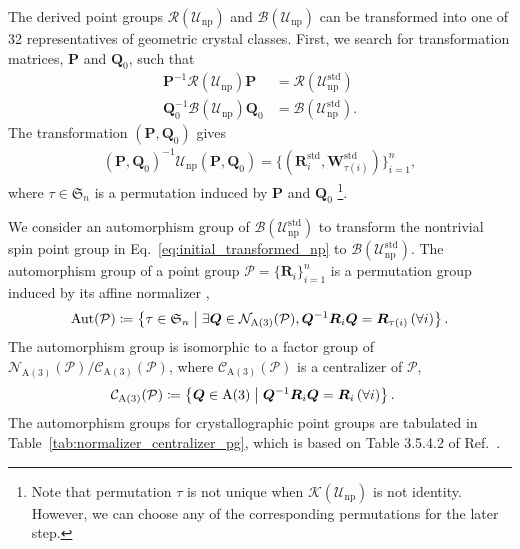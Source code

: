 The derived point groups $\mathcal{R}(\mathcal{U}_{\mathrm{np}})$ and $\mathcal{B}(\mathcal{U}_{\mathrm{np}})$ can be transformed into one of 32 representatives of geometric crystal classes.
First, we search for transformation matrices, $\bm{P}$ and $\bm{Q}_{0}$, such that
\begin{align}
  \bm{P}^{-1} \mathcal{R}(\mathcal{U}_{\mathrm{np}}) \bm{P} &= \mathcal{R}(\mathcal{U}_{\mathrm{np}}^{\mathrm{std}}) \\
  \bm{Q}_{0}^{-1} \mathcal{B}(\mathcal{U}_{\mathrm{np}}) \bm{Q}_{0} &= \mathcal{B}(\mathcal{U}_{\mathrm{np}}^{\mathrm{std}}).
\end{align}
The transformation $(\bm{P}, \bm{Q}_{0})$ gives
\begin{align}
  \label{eq:initial_transformed_np}
  (\bm{P}, \bm{Q}_{0})^{-1} \mathcal{U}_{\mathrm{np}} (\bm{P}, \bm{Q}_{0})
    = \{ (\bm{R}_{i}^{\mathrm{std}}, \bm{W}_{\tau(i)}^{\mathrm{std}}) \}_{i=1}^{n},
\end{align}
where $\tau \in \mathfrak{S}_{n}$ is a permutation induced by $\bm{P}$ and $\bm{Q}_{0}$ \footnote{
  Note that permutation $\tau$ is not unique when $\mathcal{K}(\mathcal{U}_{\mathrm{np}})$ is not identity.
  However, we can choose any of the corresponding permutations for the later step.
}.

We consider an automorphism group of $\mathcal{B}(\mathcal{U}_{\mathrm{np}}^{\mathrm{std}})$ to transform the nontrivial spin point group in Eq.~\eqref{eq:initial_transformed_np} to $\mathcal{B}(\mathcal{U}_{\mathrm{np}}^{\mathrm{std}})$.
The automorphism group of a point group $\mathcal{P} = \{ \bm{R}_{i} \}_{i=1}^{n}$ is a permutation group induced by its affine normalizer \cite{Gubler1982},
\begin{align}
  \mathrm{Aut}(\mathcal{P})
    \coloneqq \left\{ \tau \in \mathfrak{S}_{n}  \mathrel{}\middle|\mathrel{}  \exists \bm{Q} \in \mathcal{N}_{\mathrm{A}(3)}(\mathcal{P}), \bm{Q}^{-1}\bm{R}_{i}\bm{Q} = \bm{R}_{\tau(i)} \, (\forall i)  \right\}.
\end{align}
The automorphism group is isomorphic to a factor group of $\mathcal{N}_{\mathrm{A}(3)}(\mathcal{P}) / \mathcal{C}_{\mathrm{A}(3)}(\mathcal{P})$, where $\mathcal{C}_{\mathrm{A}(3)}(\mathcal{P})$ is a centralizer of $\mathcal{P}$,
\begin{align}
  \mathcal{C}_{\mathrm{A}(3)}(\mathcal{P})
    &\coloneqq \left\{  \bm{Q} \in \mathrm{A}(3)  \mathrel{}\middle|\mathrel{}  \bm{Q}^{-1} \bm{R}_{i} \bm{Q} = \bm{R}_{i} \, (\forall i)  \right\}.
\end{align}
The automorphism groups for crystallographic point groups are tabulated in Table~\ref{tab:normalizer_centralizer_pg}, which is based on Table 3.5.4.2 of Ref.~\cite{koch2016normalizers}.

